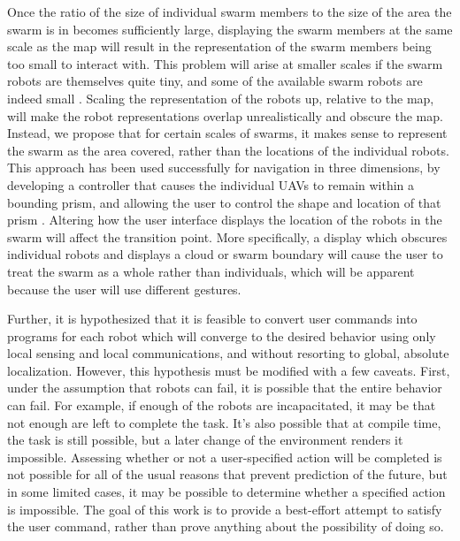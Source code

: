 \documentclass[]{article}
\begin{document}
Once the ratio of the size of individual swarm members to the size of the area the swarm is in becomes sufficiently large, displaying the swarm members at the same scale as the map will result in the representation of the swarm members being too small to interact with. 
This problem will arise at smaller scales if the swarm robots are themselves quite tiny, and some of the available swarm robots are indeed small \cite{pelrine2012diamagnetically}.
Scaling the representation of the robots up, relative to the map, will make the robot representations overlap unrealistically and obscure the map. 
Instead, we propose that for certain scales of swarms, it makes sense to represent the swarm as the area covered, rather than the locations of the individual robots.
This approach has been used successfully for navigation in three dimensions, by developing a controller that causes the individual UAVs to remain within a bounding prism, and allowing the user to control the shape and location of that prism \cite{ayanian2014controlling}.
Altering how the user interface displays the location of the robots in the swarm will affect the transition point. 
More specifically, a display which obscures individual robots and displays a cloud or swarm boundary will cause the user to treat the swarm as a whole rather than individuals, which will be apparent because the user will use different gestures. 

Further, it is hypothesized that it is feasible to convert user commands into programs for each robot which will converge to the desired behavior using only local sensing and local communications, and without resorting to global, absolute localization. 
However, this hypothesis must be modified with a few caveats. 
First, under the assumption that robots can fail, it is possible that the entire behavior can fail. 
For example, if enough of the robots are incapacitated, it may be that not enough are left to complete the task. 
It's also possible that at compile time, the task is still possible, but a later change of the environment renders it impossible. 
Assessing whether or not a user-specified action will be completed is not possible for all of the usual reasons that prevent prediction of the future, but in some limited cases, it may be possible to determine whether a specified action is impossible. The goal of this work is to provide a best-effort attempt to satisfy the user command, rather than prove anything about the possibility of doing so. 

\end{document}
